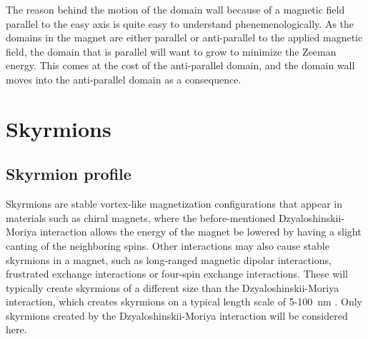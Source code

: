 \documentclass[12pt, a4paper]{article}		%
\numberwithin{equation}{section}
\begin{document}
The reason behind the motion of the domain wall because of a magnetic field parallel to the easy axis is quite easy to understand phenemenologically. As the domains in the magnet are either parallel or anti-parallel to the applied magnetic field, the domain that is parallel will want to grow to minimize the Zeeman energy. This comes at the cost of the anti-parallel domain, and the domain wall moves into the anti-parallel domain as a consequence.

\section{Skyrmions}
\subsection{Skyrmion profile}
Skyrmions are stable vortex-like magnetization configurations that appear in materials such as chiral magnets, where the before-mentioned Dzyaloshinskii-Moriya interaction allows the energy of the magnet be lowered by having a slight canting of the neighboring spins. Other interactions may also cause stable skyrmions in a magnet, such as long-ranged magnetic dipolar interactions, frustrated exchange interactions or four-spin exchange interactions. These will typically create skyrmions of a different size than the Dzyaloshinskii-Moriya interaction, which creates skyrmions on a typical length scale of 5-\SI{100}{nm} \cite{Nagaosa2013}. Only skyrmions created by the Dzyaloshinskii-Moriya interaction will be considered here.
\end{document}
